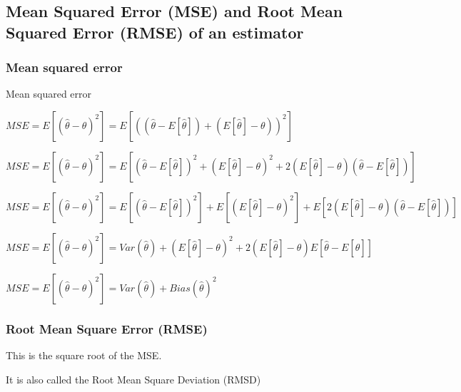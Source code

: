 
\subsection{Mean Squared Error (MSE) and Root Mean Squared Error (RMSE) of an estimator}

\subsubsection{Mean squared error}

Mean squared error

\(MSE = E[(\hat \theta - \theta )^2]=E[((\hat \theta - E[\hat \theta ])+(E[\hat \theta ]-\theta ))^2]\)

\(MSE = E[(\hat \theta - \theta )^2]=E[(\hat \theta - E[\hat \theta ])^2+(E[\hat \theta ]-\theta )^2+2(E[\hat \theta ]-\theta )(\hat \theta- E[\hat \theta ])]\)

\(MSE = E[(\hat \theta - \theta )^2]=E[(\hat \theta - E[\hat \theta ])^2]+E[(E[\hat \theta ]-\theta)^2] +E[2(E[\hat \theta ]-\theta )(\hat \theta- E[\hat \theta ])]\)

\(MSE = E[(\hat \theta - \theta )^2]=Var(\hat \theta )+(E[\hat \theta ]-\theta)^2 +2(E[\hat \theta ]-\theta )E[\hat \theta- E[\hat \theta ]]\)

\(MSE = E[(\hat \theta - \theta )^2]=Var(\hat \theta )+Bias (\hat \theta )^2\)

\subsubsection{Root Mean Square Error (RMSE)}

This is the square root of the MSE.

It is also called the Root Mean Square Deviation (RMSD)

